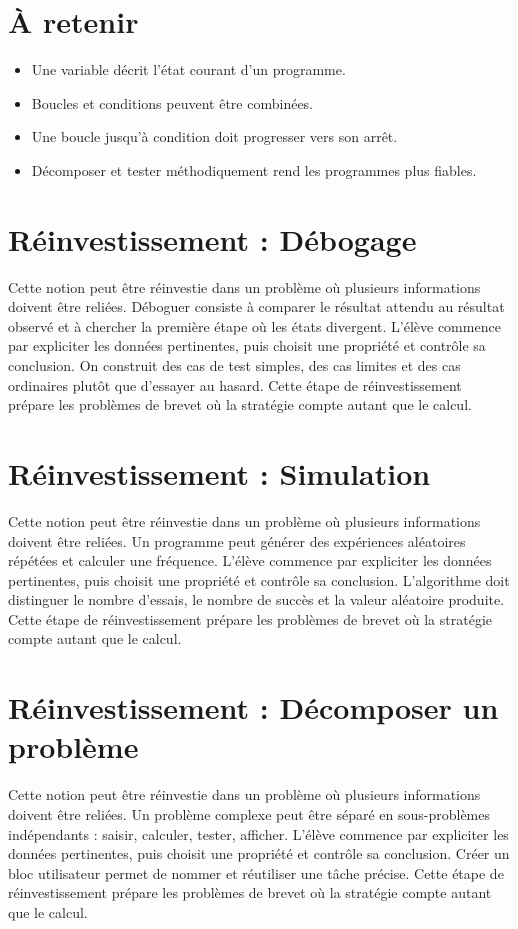 \section{À retenir}
\begin{aretenir}
\begin{itemize}
\item Une variable décrit l’état courant d’un programme.
\item Boucles et conditions peuvent être combinées.
\item Une boucle jusqu’à condition doit progresser vers son arrêt.
\item Décomposer et tester méthodiquement rend les programmes plus fiables.
\end{itemize}
\end{aretenir}

\section{Réinvestissement : Débogage}
Cette notion peut être réinvestie dans un problème où plusieurs informations doivent être reliées. Déboguer consiste à comparer le résultat attendu au résultat observé et à chercher la première étape où les états divergent. L’élève commence par expliciter les données pertinentes, puis choisit une propriété et contrôle sa conclusion. On construit des cas de test simples, des cas limites et des cas ordinaires plutôt que d’essayer au hasard. Cette étape de réinvestissement prépare les problèmes de brevet où la stratégie compte autant que le calcul.

\section{Réinvestissement : Simulation}
Cette notion peut être réinvestie dans un problème où plusieurs informations doivent être reliées. Un programme peut générer des expériences aléatoires répétées et calculer une fréquence. L’élève commence par expliciter les données pertinentes, puis choisit une propriété et contrôle sa conclusion. L’algorithme doit distinguer le nombre d’essais, le nombre de succès et la valeur aléatoire produite. Cette étape de réinvestissement prépare les problèmes de brevet où la stratégie compte autant que le calcul.

\section{Réinvestissement : Décomposer un problème}
Cette notion peut être réinvestie dans un problème où plusieurs informations doivent être reliées. Un problème complexe peut être séparé en sous-problèmes indépendants : saisir, calculer, tester, afficher. L’élève commence par expliciter les données pertinentes, puis choisit une propriété et contrôle sa conclusion. Créer un bloc utilisateur permet de nommer et réutiliser une tâche précise. Cette étape de réinvestissement prépare les problèmes de brevet où la stratégie compte autant que le calcul.
